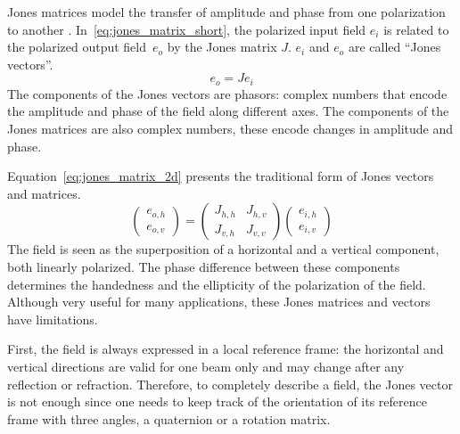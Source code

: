 \documentclass[journal]{IEEEtran}
\begin{document}
Jones matrices model the transfer of amplitude and phase from one polarization to another \cite{hecht2002optics}.
In~\eqref{eq:jones_matrix_short}, the polarized input field $e_i$ is related to the polarized output field~$e_o$ by the Jones matrix $J$.
$e_i$ and $e_o$ are called ``Jones vectors''.
\begin{equation}
    e_o = J e_i
    \label{eq:jones_matrix_short}
\end{equation}
The components of the Jones vectors are phasors: complex numbers that encode the amplitude and phase of the field along different axes.
The components of the Jones matrices are also complex numbers, these encode changes in amplitude and phase.

Equation~\eqref{eq:jones_matrix_2d} presents the traditional form of Jones vectors and matrices.
\begin{equation}
    \begin{pmatrix}
        e_{o, h}\\
        e_{o, v}
    \end{pmatrix}
    =
    \begin{pmatrix}
        J_{h, h}   &   J_{h, v} \\
        J_{v, h}   &   J_{v, v}
    \end{pmatrix}
    \begin{pmatrix}
        e_{i, h}\\
        e_{i, v}
    \end{pmatrix}
    \label{eq:jones_matrix_2d}
\end{equation}
The field is seen as the superposition of a horizontal and a vertical component, both linearly polarized.
The phase difference between these components determines the handedness and the ellipticity of the polarization of the field.
Although very useful for many applications, these Jones matrices and vectors have limitations.

First, the field is always expressed in a local reference frame: the horizontal and vertical directions are valid for one beam only and may change after any reflection or refraction.
Therefore, to completely describe a field, the Jones vector is not enough since one needs to keep track of the orientation of its reference frame with three angles, a quaternion or a rotation matrix.
\end{document}
